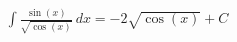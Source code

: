 \documentclass[preview]{standalone}
\begin{document}
\begin{align*}
\int \frac{\sin(x)}{\sqrt{\cos(x)}} \, dx = -2\sqrt{\cos(x)} + C
\end{align*}
\end{document}
